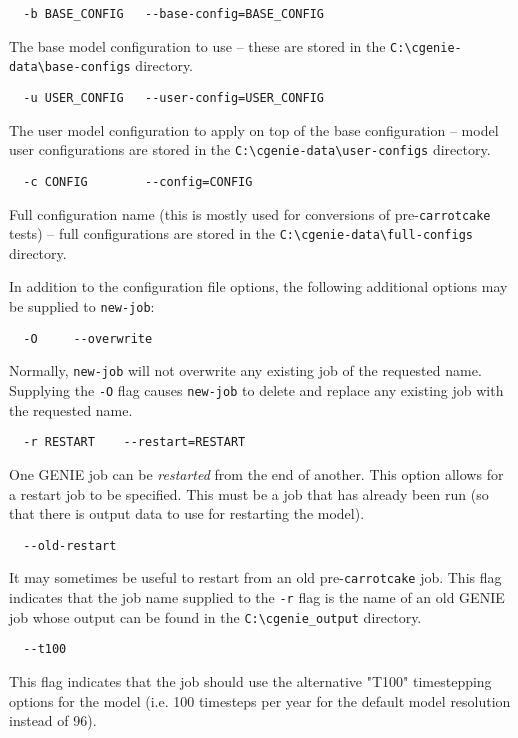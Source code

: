 \documentclass[a4paper,10pt,article]{memoir}
\begin{document}
\begin{verbatim}
  -b BASE_CONFIG   --base-config=BASE_CONFIG
\end{verbatim}
The base model configuration to use -- these are stored in the
\texttt{C:\textbackslash{}cgenie-data\textbackslash{}base-configs} directory.

\begin{verbatim}
  -u USER_CONFIG   --user-config=USER_CONFIG
\end{verbatim}
The user model configuration to apply on top of the base configuration
-- model user configurations are stored in the
\texttt{C:\textbackslash{}cgenie-data\textbackslash{}user-configs}
directory.

\begin{verbatim}
  -c CONFIG        --config=CONFIG
\end{verbatim}
Full configuration name (this is mostly used for conversions of
pre-\texttt{carrotcake} tests) -- full configurations are stored in the
\texttt{C:\textbackslash{}cgenie-data\textbackslash{}full-configs}
directory.

In addition to the configuration file options, the following
additional options may be supplied to \texttt{new-job}:

\begin{verbatim}
  -O     --overwrite
\end{verbatim}
Normally, \texttt{new-job} will not overwrite any existing job of the
requested name.  Supplying the \texttt{-O} flag causes
\texttt{new-job} to delete and replace any existing job with the
requested name.

\begin{verbatim}
  -r RESTART    --restart=RESTART
\end{verbatim}
One GENIE job can be \emph{restarted} from the end of another.  This
option allows for a restart job to be specified.  This must be a job
that has already been run (so that there is output data to use for
restarting the model).

\begin{verbatim}
  --old-restart
\end{verbatim}
It may sometimes be useful to restart from an old pre-\texttt{carrotcake}
job.  This flag indicates that the job name supplied to the
\texttt{-r} flag is the name of an old GENIE job whose output can be
found in the \texttt{C:\textbackslash{}cgenie\_output} directory.

\begin{verbatim}
  --t100
\end{verbatim}
This flag indicates that the job should use the alternative "T100"
timestepping options for the model (i.e. 100 timesteps per year for
the default model resolution instead of 96).
\end{document}
